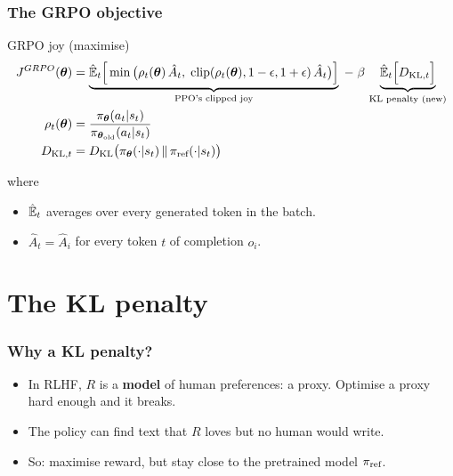 \begin{frame}
    \frametitle{The GRPO objective}
    \begin{block}{GRPO joy (maximise)}
        \begin{align*}
        J^{GRPO}({\boldsymbol{\theta}}) &=
        \underbrace{\hat{\mathbb{E}}_t\Big[\min\big(\rho_t({\boldsymbol{\theta}})\,\hat{A}_t,\;
        \text{clip}(\rho_t({\boldsymbol{\theta}}), 1-\epsilon, 1+\epsilon)\,\hat{A}_t\big)\Big]}_{\text{PPO's clipped joy}}
        \;-\; \beta\, \underbrace{\hat{\mathbb{E}}_t\Big[D_{\mathrm{KL},t}\Big]}_{\text{KL penalty (new)}} \\
        \rho_t({\boldsymbol{\theta}}) &= \frac{\pi_{\boldsymbol{\theta}}(a_t|s_t)}{\pi_{{\boldsymbol{\theta}}_{\text{old}}}(a_t|s_t)} \\
        D_{\mathrm{KL},t} &= D_{\mathrm{KL}}\big(\pi_{\boldsymbol{\theta}}(\cdot|s_t) \,\|\, \pi_{\text{ref}}(\cdot|s_t)\big)
    \end{align*}
    \end{block}
    where 
    \begin{itemize}
        \item $\hat{\mathbb{E}}_t$ averages over every generated token in the batch.
        \item $\hat{A}_t = \hat{A}_i$ for every token $t$ of completion $o_i$.
    \end{itemize}
    \pause
    \vspace{0.1cm}
\end{frame}

\section{The KL penalty}

\begin{frame}
    \frametitle{Why a KL penalty?}
    \begin{itemize}
        \item In RLHF, $R$ is a \textbf{model} of human preferences: a proxy.
        Optimise a proxy hard enough and it breaks.
        \item The policy can find text that $R$ loves but no human would write.
        \item So: maximise reward, but stay close to the pretrained model $\pi_{\text{ref}}$.
    \end{itemize}
\end{frame}

